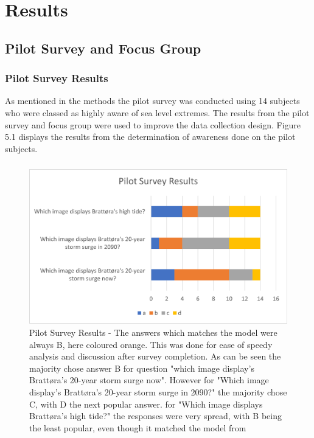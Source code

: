 \chapter{Results}

\section{Pilot Survey and Focus Group}

\subsection{Pilot Survey Results}
As mentioned in the methods the pilot survey was conducted using 14 subjects who were classed as highly aware of sea level extremes. The results from the pilot survey and focus group were used to improve the data collection design. Figure 5.1 displays the results from the determination of awareness done on the pilot subjects.
\paragraph{}

\begin{figure}[h!]
    \centering
    \includegraphics{fig_results/pilot-survey-results.png}
    \caption{Pilot Survey Results - The answers which matches the model \cite{kartverket_se_2021} were always B, here coloured orange. This was done for ease of speedy analysis and discussion after survey completion.  As can be seen the majority chose answer B for question "which image display's Brattøra's 20-year storm surge now". However for "Which image display's Brattøra's 20-year storm surge in 2090?" the majority chose C, with D the next popular answer. for "Which image displays Brattøra's high tide?" the responses were very spread, with B being the least popular, even though it matched the model from \cite{kartverket_se_2021}    }
    \label{fig:pilot_survey_results}
\end{figure}

